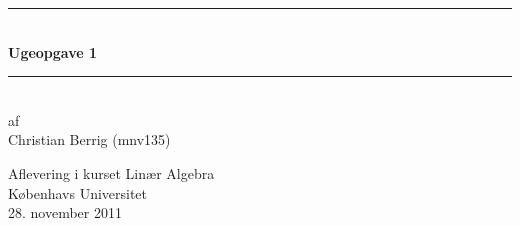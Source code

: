 \begin{titlepage}
\centering
{}
\rule{\textwidth}{1mm}\\
\vspace{1cm}
\Huge\bfseries Ugeopgave 1\\
\vspace{0.7cm}
\rule{\textwidth}{1mm}\\
\vspace{3cm}
\large af\\
Christian Berrig (mnv135)\\
\normalsize
\begin{flushleft}
Aflevering i kurset Linær Algebra\\
Københavs Universitet\\
28. november 2011
\end{flushleft}
\end{titlepage}

